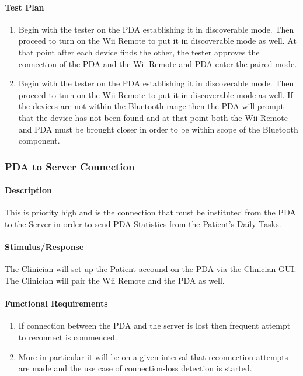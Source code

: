 \documentclass{article}
\begin{document}
\paragraph {Test Plan}
\begin{enumerate}
\item Begin with the tester on the PDA establishing it in discoverable mode. Then proceed to turn on the Wii Remote to put it in discoverable mode as well.  At that point after each device finds the other, the tester approves the connection of the PDA and the Wii Remote and PDA enter the paired mode. 
\item Begin with the tester on the PDA establishing it in discoverable mode. Then proceed to turn on the Wii Remote to put it in discoverable mode as well. If the devices are not within the Bluetooth range then the PDA will prompt that the device has not been found and at that point  both the Wii Remote and PDA must be brought closer in order to be within scope of the Bluetooth component.
\end{enumerate}

\subsubsection {PDA to Server Connection}\label{sec: PDA Server Conn}
\paragraph {Description}
This is priority high and is the connection that must be instituted from the PDA to the Server in order to send PDA Statistics from the Patient's Daily Tasks. 
 
\paragraph {Stimulus/Response}
The Clinician will set up the Patient accound on the PDA via the Clinician GUI. The Clinician will pair the Wii Remote and the PDA as well. 

 
\paragraph {Functional Requirements}
\begin{enumerate}
\item If connection between the PDA and the server is lost then frequent attempt to reconnect is commenced.
\item More in particular it will be on a given interval that reconnection attempts are made and the use case of connection-loss detection is started.
\end{enumerate}
\end{document}
